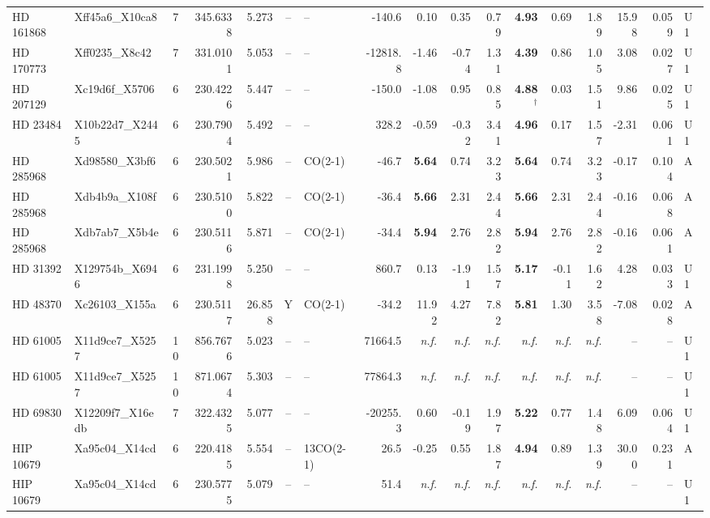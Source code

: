 \begin{tabular}{@{}l@{~}l@{~}c@{~}r@{~}r@{~}c@{~}l@{~}r@{~~}r@{~}r@{~}r@{~~}r@{~}r@{~}r@{~~}r@{~}r@{~}l@{}}
HD 161868 & Xff45a6\_X10ca8 & 7 & 345.6338 & 5.273 & -- & -- & -140.6 & 0.10 & 0.35 & 0.79 & \textbf{4.93} & 0.69 & 1.89 & 15.98 & 0.059 & U1 \\
HD 170773 & Xff0235\_X8c42 & 7 & 331.0101 & 5.053 & -- & -- & -12818.8 & -1.46 & -0.74 & 1.31 & \textbf{4.39} & 0.86 & 1.05 & 3.08 & 0.027 & U1 \\
HD 207129 & Xc19d6f\_X5706 & 6 & 230.4226 & 5.447 & -- & -- & -150.0 & -1.08 & 0.95 & 0.85 & \textbf{4.88}$^{\dagger}$ & 0.03 & 1.51 & 9.86 & 0.025 & U1 \\
HD 23484 & X10b22d7\_X2445 & 6 & 230.7904 & 5.492 & -- & -- & 328.2 & -0.59 & -0.32 & 3.41 & \textbf{4.96} & 0.17 & 1.57 & -2.31 & 0.061 & U1 \\
HD 285968 & Xd98580\_X3bf6 & 6 & 230.5021 & 5.986 & -- & CO(2-1) & -46.7 & \textbf{5.64} & 0.74 & 3.23 & \textbf{5.64} & 0.74 & 3.23 & -0.17 & 0.104 & A \\
HD 285968 & Xdb4b9a\_X108f & 6 & 230.5100 & 5.822 & -- & CO(2-1) & -36.4 & \textbf{5.66} & 2.31 & 2.44 & \textbf{5.66} & 2.31 & 2.44 & -0.16 & 0.068 & A \\
HD 285968 & Xdb7ab7\_X5b4e & 6 & 230.5116 & 5.871 & -- & CO(2-1) & -34.4 & \textbf{5.94} & 2.76 & 2.82 & \textbf{5.94} & 2.76 & 2.82 & -0.16 & 0.061 & A \\
HD 31392 & X129754b\_X6946 & 6 & 231.1998 & 5.250 & -- & -- & 860.7 & 0.13 & -1.91 & 1.57 & \textbf{5.17} & -0.11 & 1.62 & 4.28 & 0.033 & U1 \\
HD 48370 & Xc26103\_X155a & 6 & 230.5117 & 26.858 & Y & CO(2-1) & -34.2 & 11.92 & 4.27 & 7.82 & \textbf{5.81} & 1.30 & 3.58 & -7.08 & 0.028 & A \\
HD 61005 & X11d9ce7\_X5257 & 10 & 856.7676 & 5.023 & -- & -- & 71664.5 & \emph{n.f.} & \emph{n.f.} & \emph{n.f.} & \emph{n.f.} & \emph{n.f.} & \emph{n.f.} & -- & -- & U1 \\
HD 61005 & X11d9ce7\_X5257 & 10 & 871.0674 & 5.303 & -- & -- & 77864.3 & \emph{n.f.} & \emph{n.f.} & \emph{n.f.} & \emph{n.f.} & \emph{n.f.} & \emph{n.f.} & -- & -- & U1 \\
HD 69830 & X12209f7\_X16edb & 7 & 322.4325 & 5.077 & -- & -- & -20255.3 & 0.60 & -0.19 & 1.97 & \textbf{5.22} & 0.77 & 1.48 & 6.09 & 0.064 & U1 \\
HIP 10679 & Xa95c04\_X14cd & 6 & 220.4185 & 5.554 & -- & 13CO(2-1) & 26.5 & -0.25 & 0.55 & 1.87 & \textbf{4.94} & 0.89 & 1.39 & 30.00 & 0.231 & A \\
HIP 10679 & Xa95c04\_X14cd & 6 & 230.5775 & 5.079 & -- & -- & 51.4 & \emph{n.f.} & \emph{n.f.} & \emph{n.f.} & \emph{n.f.} & \emph{n.f.} & \emph{n.f.} & -- & -- & U1 \\

\end{tabular}
